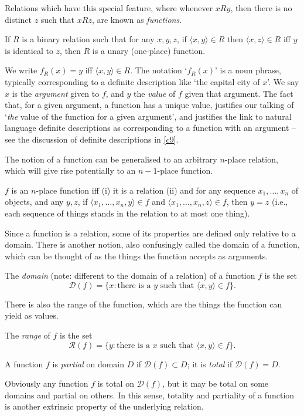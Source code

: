 Relations which have this special feature, where whenever $xRy$, then there is no distinct $z$ such that $xRz$, are known as \emph{functions}. 
\begin{definition}
  If $R$ is a binary relation such that for any $x,y,z$, if $\langle x,y\rangle\in R$ then $\langle x,z\rangle\in R$ iff $y$ is identical to $z$, then $R$ is a unary (one-place) function. 
\end{definition}
We write $f_{R}(x) =y$ iff $\langle x,y\rangle\in R$. The notation `$f_{R}(x)$' is a noun phrase, typically corresponding to a definite description like `the capital city of $x$'. We say $x$ is the \emph{argument} given to $f$, and $y$ the \emph{value} of $f$ given that argument.  The fact that, for a given argument, a function has a unique value, justifies our talking of `\emph{the} value of the function for a given argument', and justifies the link to natural language definite descriptions as corresponding to a function with an argument – see the discussion of definite descriptions in \autoref{c9}. 

The notion of a function can be generalised to an arbitrary $n$-place relation, which will give rise potentially to an $n-1$-place function.
\begin{definition}[Function]
	$f$ is an $n$-place function iff (i) it is a relation (ii) and for any sequence $x_{1},\ldots,x_{n}$ of objects, and any $y,z$, if $\langle x_{1},\ldots,x_{n},y\rangle \in f$ and $\langle x_{1},\ldots,x_{n},z\rangle \in f$, then $y=z$ (i.e., each sequence of things stands in the relation to at most one thing). 
\end{definition}

Since a function is a relation, some of its properties are defined only relative to a domain. There is another notion, also confusingly called the domain of a function, which can be thought of as the things the function accepts as arguments.
\begin{definition}[Domain]
The \emph{domain} (note: different to the domain of a relation) of a function  $f$ is the set $$\mathcal{D}(f)=\{x: \text{there is a $y$ such that } \langle x,y \rangle \in f\}.$$
\end{definition} There is also the range of the function, which are the things the function can yield as values.
\begin{definition}[Range]
	The \emph{range} of $f$ is the set $$\mathcal{R}(f)=\{y: \text{there is a $x$ such that } \langle x,y \rangle \in f\}.$$
\end{definition}
\begin{definition}
	A function $f$ is \emph{partial}  on domain $D$ if $\mathcal{D}(f) \subset D$; it is \emph{total} if $\mathcal{D}(f) =D$.
\end{definition} Obviously any function $f$ is total on $\mathscr{D}(f)$, but it may be total on some domains and partial on others. In this sense, totality and partiality of a function is another extrinsic property of the underlying relation.

